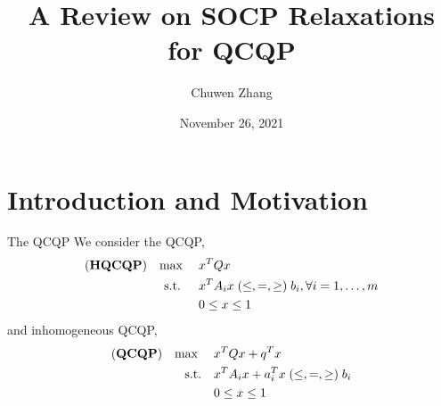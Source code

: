 \documentclass[aspectratio=1610, 10pt]{beamer}
\newcommand{\model}[1]{(\textbf{#1})}
\newcommand{\mx}{\mathbf{\max}\;}
\begin{document}
\title{A Review on SOCP Relaxations for QCQP}

\author{
  Chuwen Zhang
}


\date{November 26, 2021}

\maketitle

\section{Introduction and Motivation}

\begin{frame}{The QCQP}
  We consider the QCQP,
  \begin{equation}
    \begin{aligned}
      \model{HQCQP} \quad \mx \quad & x^T Qx                                  \\
      \text{s.t. } \quad            & x^T A_i x \hspace{0.27em} (\le, =, \ge)
      \hspace{0.27em} b_i, \forall i = 1, \ldots, m                           \\
                                    & 0 \le x \le 1
    \end{aligned}
  \end{equation}
  and inhomogeneous QCQP,
  \begin{equation}
    \label{eq:inhoqcqp}
    \begin{aligned}
      \model{QCQP} \quad \mx \quad & x^T Qx + q^T x                                    \\
      \textrm{s.t.} \quad          & x^T A_i x + a_i^T x \hspace{0.27em} (\le, =, \ge)
      \hspace{0.27em} b_i                                                              \\
                                   & 0 \le x \le 1
    \end{aligned}
  \end{equation}
\end{frame}
\end{document}
